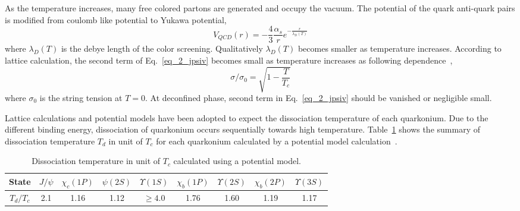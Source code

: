 As the temperature increases, many free colored partons are generated and occupy the vacuum. 
The potential of the quark anti-quark pairs is modified from coulomb like potential to Yukawa potential, 
\begin{equation}
  V_{QCD}(r) = -\frac{4}{3}\frac{\alpha_{s}}{r}e^{-\frac{r}{\lambda_{D}(T)}}
\end{equation}
where $\lambda_{D}(T)$ is the debye length of the color screening. 
Qualitatively $\lambda_{D}(T)$ becomes smaller as temperature increases. 
According to lattice calculation, the second term of Eq.~\ref{eq_2_jpsiv} becomes small as temperature increases as following dependence~\cite{bib_tension}, 
\begin{equation}
  \sigma/\sigma_{0} = \sqrt{1-\frac{T}{T_{c}}}
\end{equation}
where $\sigma_{0}$ is the string tension at $T$$=$0.
At deconfined phase, second term in Eq.~\ref{eq_2_jpsiv} should be vanished or negligible small. 

Lattice calculations and potential models have been adopted to expect the dissociation temperature of each quarkonium. 
Due to the different binding energy, dissociation of quarkonium occurs sequentially towards high temperature. 
Table~\ref{table_2_melt} shows the summary of dissociation temperature $T_{d}$ in unit of $T_{c}$ for each quarkonium calculated by a potential model calculation~\cite{bib_melt}.

\begin{table}[!h]
  \centering
  \begin{tabular}{ccccccccc} \\ \hline
    State   & $J/\psi$  & $\chi_{c}(1P)$  & $\psi (2S)$ & $\Upsilon (1S)$ & $\chi _{b}(1P)$ & $\Upsilon (2S)$  & $\chi_{b}(2P)$  & $\Upsilon (3S)$ \\ \hline
    $T_{d}/T_{c}$ & 2.1 & 1.16 & 1.12 & $\geq 4.0$ & 1.76 & 1.60 & 1.19 & 1.17 \\ \hline
  \end{tabular}
  \caption{Dissociation temperature in unit of $T_{c}$ calculated using a potential model\cite{bib_melt}.  }
  \label{table_2_melt}
\end{table}


